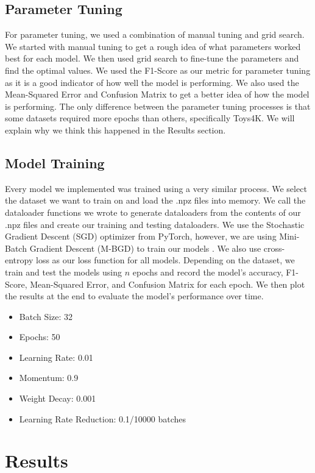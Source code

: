 \documentclass[conference]{IEEEtran}
\begin{document}
\subsection{Parameter Tuning}
For parameter tuning, we used a combination of manual tuning and grid search. We started with manual tuning to get a rough idea of what parameters worked best for each model. We then used grid search to fine-tune the parameters and find the optimal values. We used the F1-Score as our metric for parameter tuning as it is a good indicator of how well the model is performing. We also used the Mean-Squared Error and Confusion Matrix to get a better idea of how the model is performing. The only difference between the parameter tuning processes is that some datasets required more epochs than others, specifically Toys4K. We will explain why we think this happened in the Results section.

\subsection{Model Training}
Every model we implemented was trained using a very similar process. We select the dataset we want to train on and load the .npz files into memory. We call the dataloader functions we wrote to generate dataloaders from the contents of our .npz files and create our training and testing dataloaders. We use the Stochastic Gradient Descent (SGD) optimizer from PyTorch, however, we are using Mini-Batch Gradient Descent (M-BGD) to train our models \cite{7353481}. We also use cross-entropy loss as our loss function for all models. Depending on the dataset, we train and test the models using \(n\) epochs and record the model's accuracy, F1-Score, Mean-Squared Error, and Confusion Matrix for each epoch. We then plot the results at the end to evaluate the model's performance over time.

\begin{itemize}
    \item Batch Size: 32
    \item Epochs: 50
    \item Learning Rate: 0.01
    \item Momentum: 0.9
    \item Weight Decay: 0.001
    \item Learning Rate Reduction: 0.1/10000 batches
\end{itemize}

\section{Results}
\end{document}
